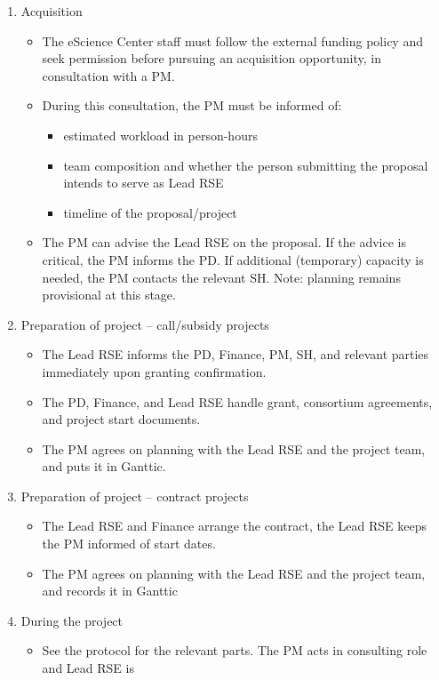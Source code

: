 \begin{enumerate}[label=\arabic*.,ref=\arabic*]
\item Acquisition
\begin{itemize}
\item The eScience Center staff must follow the external funding policy and seek permission before pursuing an acquisition opportunity, in consultation with a PM.
\item During this consultation, the PM  must be informed of:
\begin{itemize}
\item estimated workload in person-hours
\item team composition and whether the person submitting the proposal  intends to serve as Lead RSE
\item timeline of the proposal/project
\end{itemize}
\item The PM can advise the Lead RSE on the proposal. If the advice is critical, the PM informs the PD. 
If additional (temporary) capacity is needed, the PM contacts the relevant SH. 
Note: planning remains provisional at this stage.
\end{itemize}
\item Preparation of project – call/subsidy projects
\begin{itemize}
\item The Lead RSE informs the PD, Finance, PM, SH, and relevant parties immediately upon granting confirmation.
\item The PD, Finance, and Lead RSE handle grant, consortium agreements, and project start documents.
\item The PM agrees on planning with the Lead RSE and the project team, and puts it in Ganttic.
\end{itemize}
\item Preparation of project – contract projects
\begin{itemize}
\item The Lead RSE and Finance arrange the contract, the Lead RSE keeps the PM informed of start dates.
\item The PM agrees on planning with the Lead RSE and the project team, and records it in Ganttic
\end{itemize}
\item During the project
\begin{itemize}
\item See the protocol for the relevant parts. The PM acts in consulting role and Lead RSE is

\end{itemize}
\end{enumerate}
